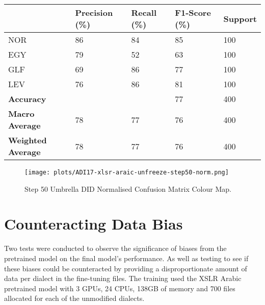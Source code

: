\begin{table}[h!]
    \centering
    \label{tab:F1Score50freeze}
    \begin{tabular}{|l|l|l|l|l|} 
    \hline
                              & \textbf{Precision (\%)} & \textbf{Recall (\%)} & \textbf{F1-Score (\%)} & \textbf{Support}  \\ 
    \hline
    NOR                       & 86                      & 84                   & 85                     & 100               \\ 
    \hline
    EGY                       & 79                      & 52                   & 63                     & 100               \\ 
    \hline
    GLF                       & 69                      & 86                   & 77                     & 100               \\ 
    \hline
    LEV                       & 76                      & 86                   & 81                     & 100               \\ 
    \hline
    \textbf{Accuracy}         &                         &                      & 77                     & 400               \\ 
    \hline
    \textbf{Macro Average}    & 78                      & 77                   & 76                     & 400               \\ 
    \hline
    \textbf{Weighted Average} & 78                      & 77                   & 76                     & 400               \\
    \hline
\end{tabular}
\end{table}

\begin{figure}[h!]
    \centering
    \texttt{[image: plots/ADI17-xlsr-araic-unfreeze-step50-norm.png]}
    \caption{Step 50 Umbrella DID Normalised Confusion Matrix Colour Map.}
    \label{fig:colour50UmbDID}
\end{figure}

\section{Counteracting Data Bias}\label{sect:dataBias}
Two tests were conducted to observe the significance of biases from the pretrained model on the final model's performance. 
As well as testing to see if these biases could be counteracted by providing a disproportionate amount of data per dialect in 
the fine-tuning files. The training used the XSLR Arabic pretrained model with 3 GPUs, 24 CPUs, 138GB of memory 
and 700 files allocated for each of the unmodified dialects. 

